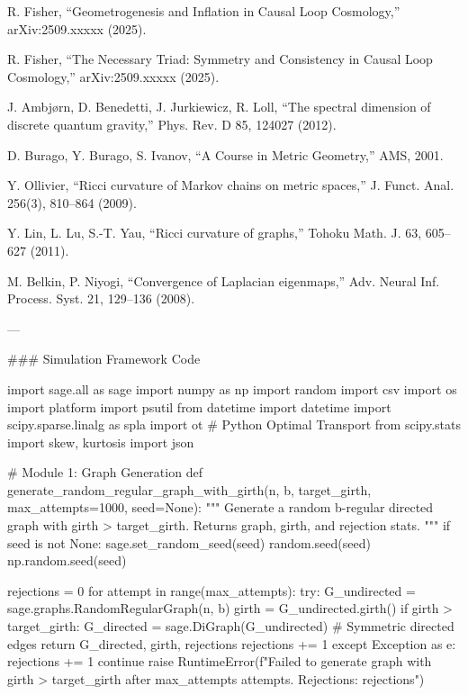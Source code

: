 \documentclass[11pt, a4paper]{article}
\begin{document}
\begin{thebibliography}{99}
R. Fisher, ``Geometrogenesis and Inflation in Causal Loop Cosmology,'' arXiv:2509.xxxxx (2025).

R. Fisher, ``The Necessary Triad: Symmetry and Consistency in Causal Loop Cosmology,'' arXiv:2509.xxxxx (2025).

J. Ambjørn, D. Benedetti, J. Jurkiewicz, R. Loll, ``The spectral dimension of discrete quantum gravity,'' Phys. Rev. D 85, 124027 (2012).

D. Burago, Y. Burago, S. Ivanov, ``A Course in Metric Geometry,'' AMS, 2001.

Y. Ollivier, ``Ricci curvature of Markov chains on metric spaces,'' J. Funct. Anal. 256(3), 810–864 (2009).

Y. Lin, L. Lu, S.-T. Yau, ``Ricci curvature of graphs,'' Tohoku Math. J. 63, 605–627 (2011).

M. Belkin, P. Niyogi, ``Convergence of Laplacian eigenmaps,'' Adv. Neural Inf. Process. Syst. 21, 129–136 (2008).
\end{thebibliography}

---

### Simulation Framework Code


import sage.all as sage
import numpy as np
import random
import csv
import os
import platform
import psutil
from datetime import datetime
import scipy.sparse.linalg as spla
import ot  # Python Optimal Transport
from scipy.stats import skew, kurtosis
import json

# Module 1: Graph Generation
def generate_random_regular_graph_with_girth(n, b, target_girth, max_attempts=1000, seed=None):
    """
    Generate a random b-regular directed graph with girth > target_girth.
    Returns graph, girth, and rejection stats.
    """
    if seed is not None:
        sage.set_random_seed(seed)
        random.seed(seed)
        np.random.seed(seed)
    
    rejections = 0
    for attempt in range(max_attempts):
        try:
            G_undirected = sage.graphs.RandomRegularGraph(n, b)
            girth = G_undirected.girth()
            if girth > target_girth:
                G_directed = sage.DiGraph(G_undirected)  # Symmetric directed edges
                return G_directed, girth, rejections
            rejections += 1
        except Exception as e:
            rejections += 1
            continue
    raise RuntimeError(f"Failed to generate graph with girth > {target_girth} after {max_attempts} attempts. Rejections: {rejections}")
\end{document}
